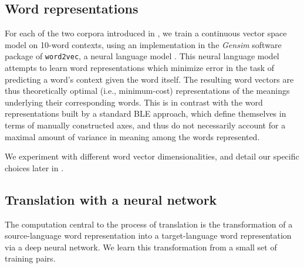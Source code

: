 \documentclass[11pt]{article}
\begin{document}
\subsection{Word representations}
\label{subsec:word-representations}

For each of the two corpora introduced in , we train a continuous vector space model on 10-word contexts, using an implementation in the \textit{Gensim} software package of \texttt{word2vec}, a neural language model \cite{rehurek2010,mikolov2013}. This neural language model attempts to learn word representations which minimize error in the task of predicting a word's context given the word itself. The resulting word vectors are thus theoretically optimal (i.e., minimum-cost) representations of the meanings underlying their corresponding words. This is in contrast with the word representations built by a standard BLE approach, which define themselves in terms of manually constructed axes, and thus do not necessarily account for a maximal amount of variance in meaning among the words represented.

We experiment with different word vector dimensionalities, and detail our specific choices later in .




\subsection{Translation with a neural network}
\label{subsec:translation-nn}

The computation central to the process of translation is the transformation of a
source-language word representation into a target-language word representation via
a deep neural network. We learn this transformation from a small set of training pairs.
\end{document}
